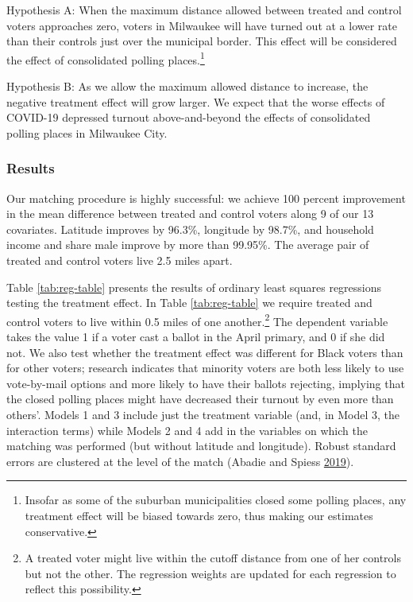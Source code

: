\documentclass[
  12pt,
]{article}
\begin{document}
Hypothesis A: When the maximum distance allowed between treated and control voters approaches zero, voters in Milwaukee will have turned out at a lower rate than their controls just over the municipal border. This effect will be considered the effect of consolidated polling places.\footnote{Insofar as some of the suburban municipalities closed some polling places, any treatment effect will be biased towards zero, thus making our estimates conservative.}

Hypothesis B: As we allow the maximum allowed distance to increase, the negative treatment effect will grow larger. We expect that the worse effects of COVID-19 depressed turnout above-and-beyond the effects of consolidated polling places in Milwaukee City.

\hypertarget{results}{%
\subsubsection*{Results}\label{results}}

Our matching procedure is highly successful: we achieve 100 percent improvement in the mean difference between treated and control voters along 9 of our 13 covariates. Latitude improves by 96.3\%, longitude by 98.7\%, and household income and share male improve by more than 99.95\%. The average pair of treated and control voters live 2.5 miles apart.

Table \ref{tab:reg-table} presents the results of ordinary least squares regressions testing the treatment effect. In Table \ref{tab:reg-table} we require treated and control voters to live within 0.5 miles of one another.\footnote{A treated voter might live within the cutoff distance from one of her controls but not the other. The regression weights are updated for each regression to reflect this possibility.} The dependent variable takes the value 1 if a voter cast a ballot in the April primary, and 0 if she did not. We also test whether the treatment effect was different for Black voters than for other voters; research indicates that minority voters are both less likely to use vote-by-mail options and more likely to have their ballots rejecting, implying that the closed polling places might have decreased their turnout by even more than others'. Models 1 and 3 include just the treatment variable (and, in Model 3, the interaction terms) while Models 2 and 4 add in the variables on which the matching was performed (but without latitude and longitude). Robust standard errors are clustered at the level of the match (Abadie and Spiess \protect\hyperlink{ref-Abadie2019}{2019}).
\end{document}
